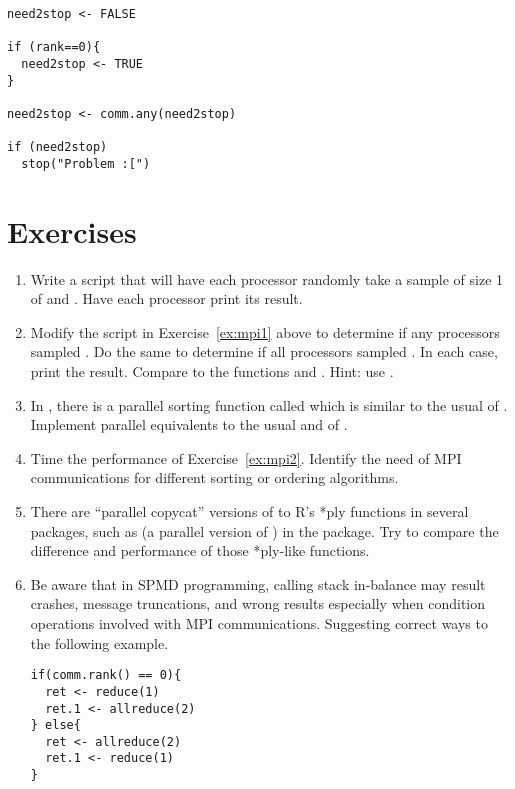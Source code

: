 \begin{lstlisting}[language=rr,title=R Code]
need2stop <- FALSE

if (rank==0){
  need2stop <- TRUE
}

need2stop <- comm.any(need2stop)

if (need2stop)
  stop("Problem :[") 
\end{lstlisting}






\section{Exercises}
\label{sec:mpi_for_the_r_user_exercise}

\begin{enumerate}[label=\thechapter-\arabic*]
\item Write a script that will have each processor randomly take a sample of
      size 1 of  and . Have each processor print its
      result.\label{ex:mpi1}

\item 
Modify the script in Exercise~\ref{ex:mpi1} above to determine if any
processors sampled . Do the same to determine if all processors 
sampled . In each case, print the result. Compare to the functions 
 and . {\color{blue} Hint:  use 
.} 

\item In , there is a parallel sorting function called      
 which is similar to the usual  of 
. Implement parallel equivalents to the usual  
and  of .\label{ex:mpi2}

\item 
Time the performance of Exercise~\ref{ex:mpi2}. Identify the need of MPI 
communications for different sorting or ordering algorithms.

\item 
There are ``parallel copycat'' versions of to R's *ply functions in several 
 packages, such as  (a parallel version of 
) in the  package.
Try to compare the difference and performance of those *ply-like functions.

\item
Be aware that in SPMD programming,
calling stack in-balance may result crashes, message truncations, and wrong
results especially when condition operations involved with MPI communications.
Suggesting correct ways to the following example.
\begin{lstlisting}[language=rr,title=R Code]
if(comm.rank() == 0){
  ret <- reduce(1)
  ret.1 <- allreduce(2)
} else{
  ret <- allreduce(2)
  ret.1 <- reduce(1)
}
\end{lstlisting}


\end{enumerate}
